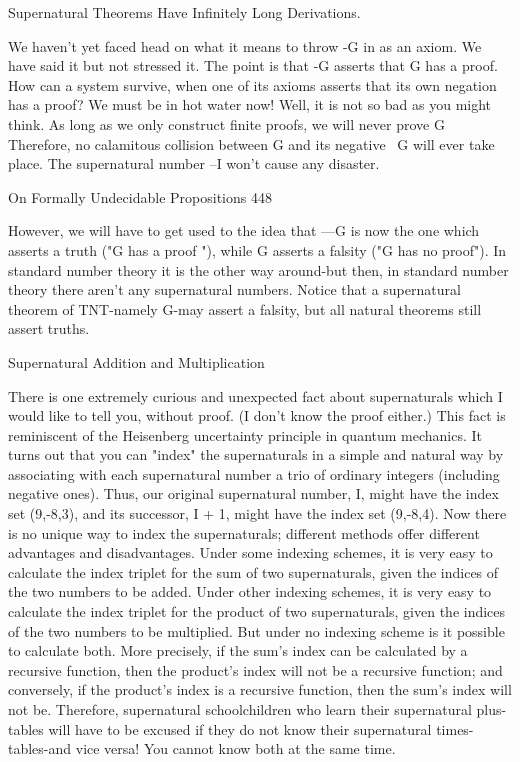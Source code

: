                 Supernatural Theorems Have Infinitely Long Derivations.

We haven't yet faced head on what it means to throw -G in as an axiom. We have said it
but not stressed it. The point is that -G asserts that G has a proof. How can a system
survive, when one of its axioms asserts that its own negation has a proof? We must be in
hot water now! Well, it is not so bad as you might think. As long as we only construct
finite proofs, we will never prove G Therefore, no calamitous collision between G and its
negative ~G will ever take place. The supernatural number –I won’t cause any disaster.




On Formally Undecidable Propositions                                                    448

However, we will have to get used to the idea that ---G is now the one which asserts a
truth ("G has a proof "), while G asserts a falsity ("G has no proof"). In standard number
theory it is the other way around-but then, in standard number theory there aren't any
supernatural numbers. Notice that a supernatural theorem of TNT-namely G-may assert a
falsity, but all natural theorems still assert truths.

                       Supernatural Addition and Multiplication

There is one extremely curious and unexpected fact about supernaturals which I would
like to tell you, without proof. (I don't know the proof either.) This fact is reminiscent of
the Heisenberg uncertainty principle in quantum mechanics. It turns out that you can
"index" the supernaturals in a simple and natural way by associating with each
supernatural number a trio of ordinary integers (including negative ones). Thus, our
original supernatural number, I, might have the index set (9,-8,3), and its successor, I + 1,
might have the index set (9,-8,4). Now there is no unique way to index the supernaturals;
different methods offer different advantages and disadvantages. Under some indexing
schemes, it is very easy to calculate the index triplet for the sum of two supernaturals,
given the indices of the two numbers to be added. Under other indexing schemes, it is
very easy to calculate the index triplet for the product of two supernaturals, given the
indices of the two numbers to be multiplied. But under no indexing scheme is it possible
to calculate both. More precisely, if the sum's index can be calculated by a recursive
function, then the product's index will not be a recursive function; and conversely, if the
product's index is a recursive function, then the sum's index will not be. Therefore,
supernatural schoolchildren who learn their supernatural plus-tables will have to be
excused if they do not know their supernatural times-tables-and vice versa! You cannot
know both at the same time.

